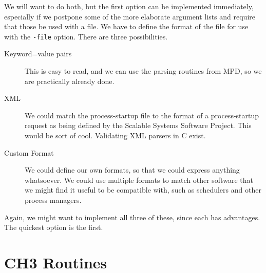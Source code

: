 \documentclass{article}
\def\code#1{\texttt{#1}}
\begin{document}
We will want to do both, but the first option can be implemented
immediately, especially if we postpone some of the more elaborate argument
lists and require that those be used with a file.  We have to define the
format of the file for use with the \code{-file} option.  There are three
possibilities.
\begin{description}
\item[Keyword=value pairs] This is easy to read, and we can use the
  parsing routines from MPD, so we are practically already done.
\item[XML] We could match the process-startup file to the format of a
  process-startup request as being defined by the Scalable Systems Software
  Project.  This would be sort of cool.  Validating XML parsers in C exist.
\item[Custom Format] We could define our own formats, so that we could express
  anything whatsoever.  We could use multiple formats to match other software
  that we might find it useful to be compatible with, such as schedulers and
  other process managers.
\end{description}

Again, we might want to implement all three of these, since each has
advantages.  The quickest option is the first.



\appendix
\section{CH3 Routines}
\label{app:ch3}
\end{document}

